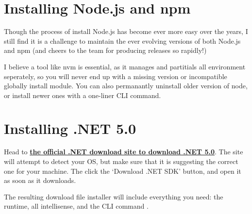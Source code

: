 \documentclass[paper=6in:9in,pagesize=pdftex,headinclude=on,footinclude=on,12pt,twoside]{scrbook}
\newcommand{\link}[2]{\textbf{\textcolor{monokaiPink}{\href{#2}{#1}}}}
\begin{document}
\printindex
{}

\begin{appendices}
\chapter{Installing Node.js and npm}

Though the process of install Node.js has become ever more easy over the years, I still find it is a challenge to maintain the ever evolving versions of both Node.js and npm (and cheers to the team for producing releases so rapidly!)

I believe a tool like nvm is essential, as it manages and partitials all environment seperately, so you will never end up with a missing version or incompatible globally install module. You can also permanantly uninstall older version of node, or install newer ones with a one-liner CLI command.

\chapter{Installing .NET 5.0}

Head to \link{the official .NET download site to download .NET 5.0}{https://dotnet.microsoft.com/download}. The site will attempt to detect your OS, but make sure that it is suggesting the correct one for your machine. The click the `Download .NET SDK' button, and open it as soon as it downloads.

The resulting download file installer will include everything you need: the runtime, all intellisense, and the CLI command .

\end{appendices}
\end{document}
